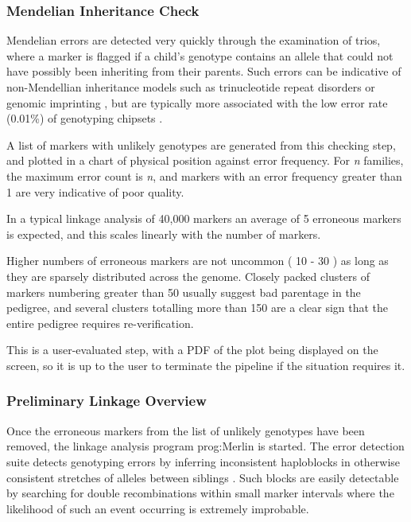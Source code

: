 \subsubsection{Mendelian Inheritance Check}

Mendelian errors are detected very quickly through the examination of trios, where a marker is flagged if a child's genotype contains an allele that could not have possibly been inheriting from their parents.  Such errors can be indicative of non-Mendellian inheritance models such as trinucleotide repeat disorders or genomic imprinting \cite{Walker2007218}, but are typically more associated with the low error rate (0.01\%) of genotyping chipsets \citep{saunders_estimating_2007}.

A list of markers with unlikely genotypes are generated from this checking step, and plotted in a chart of physical position against error frequency. For \textit{n} families, the maximum error count is \textit{n}, and markers with an error frequency greater than 1 are very indicative of poor quality.

In a typical linkage analysis of 40,000 markers an average of 5 erroneous markers is expected, and this scales linearly with the number of markers.

Higher numbers of erroneous markers are not uncommon ( 10 - 30 ) as long as they are sparsely distributed across the genome. Closely packed clusters of markers numbering greater than 50 usually suggest bad parentage in the pedigree, and several clusters totalling more than 150 are a clear sign that the entire pedigree requires re-verification.

This is a user-evaluated step, with a PDF of the plot being displayed on the screen, so it is up to the user to terminate the pipeline if the situation requires it.


\subsubsection{Preliminary Linkage Overview}

Once the erroneous markers from the list of unlikely genotypes have been removed, the linkage analysis program \gls{prog:Merlin} is started. The error detection  suite detects genotyping errors by inferring inconsistent haploblocks in otherwise consistent stretches of alleles between siblings \cite{merlin}. Such blocks are easily detectable by searching for double recombinations within small marker intervals where the likelihood of such an event occurring is extremely improbable.

